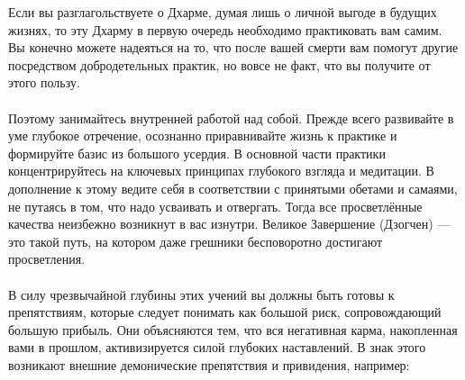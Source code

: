 Если вы разглагольствуете о Дхарме, думая лишь о личной
выгоде в будущих жизнях, то эту Дхарму в первую очередь
необходимо практиковать вам самим. Вы конечно можете
надеяться на то, что после вашей смерти вам помогут
другие посредством добродетельных практик, но вовсе
не факт, что вы получите от этого пользу.
\\
\\
Поэтому занимайтесь внутренней работой над собой.
Прежде всего развивайте в уме глубокое отречение,
осознанно приравнивайте жизнь к практике и формируйте
базис из большого усердия. В основной части практики
концентрируйтесь на ключевых принципах глубокого
взгляда и медитации. В дополнение к этому ведите
себя в соответствии с принятыми обетами и самаями,
не путаясь в том, что надо усваивать и отвергать.
Тогда все просветлённые качества неизбежно возникнут в вас изнутри.
Великое Завершение (Дзогчен) — это такой путь, на котором даже
грешники бесповоротно достигают просветления.\\
\\
\newpage
В силу чрезвычайной глубины этих учений вы должны
быть готовы к препятствиям, которые следует понимать
как большой риск, сопровождающий большую прибыль.
Они объясняются тем, что вся негативная карма,
накопленная вами в прошлом, активизируется силой
глубоких наставлений. В знак этого возникают внешние
демонические препятствия и привидения, например:\\
\\
\small
